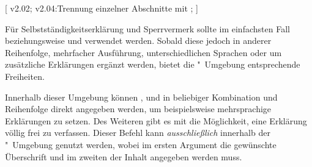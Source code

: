 \begin{DeclareEntity*}{}
\begin{DeclareEntity*}{}
\begin{DeclareEntity*}{}
\begin{Declaration}
  {}
  [
    v2.02;
    v2.04:Trennung einzelner Abschnitte mit ;
  ]
\begin{Declaration}
  {}
\begin{Declaration}
  {}
\begin{Declaration}
  {}
\begin{Declaration}
  {}
\begin{Declaration}
  {}
\begin{Declaration}
  {}
\begin{Declaration}
  {}
\begin{Declaration}
  {}
\begin{Declaration}
  {}
\begin{Declaration}
  {}
\printdeclarationlist
%
Für Selbstständigkeitserklärung und Sperrvermerk sollte im einfachsten Fall 
 beziehungsweise  und  
verwendet werden. Sobald diese jedoch in anderer Reihenfolge, mehrfacher 
Ausführung, unterschiedlichen Sprachen oder um zusätzliche Erklärungen ergänzt 
werden, bietet die "~Umgebung entsprechende 
Freiheiten.

Innerhalb dieser Umgebung können ,  und 
 in beliebiger Kombination und Reihenfolge direkt angegeben 
werden, um beispielsweise mehrsprachige Erklärungen zu setzen.
%
Des Weiteren gibt es mit  die Möglichkeit, eine 
Erklärung völlig frei zu verfassen. Dieser Befehl kann \emph{ausschließlich} 
innerhalb der "~Umgebung genutzt werden, wobei im 
ersten Argument die gewünschte Überschrift und im zweiten der Inhalt angegeben 
werden muss.


\end{Declaration}
\end{Declaration}
\end{Declaration}
\end{Declaration}
\end{Declaration}
\end{Declaration}
\end{Declaration}
\end{Declaration}
\end{Declaration}
\end{Declaration}
\end{Declaration}
\end{DeclareEntity*}
\end{DeclareEntity*}
\end{DeclareEntity*}
